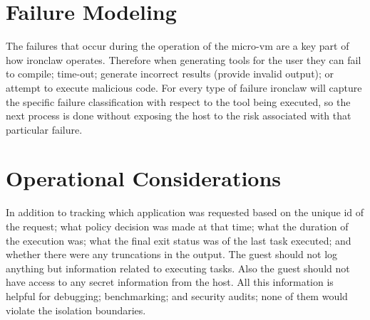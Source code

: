 \section{Failure Modeling}
The failures that occur during the operation of the micro-vm are a key part of how ironclaw operates. Therefore when generating tools for the user they can fail to compile; time-out; generate incorrect results (provide invalid output); or attempt to execute malicious code. For every type of failure ironclaw will capture the specific failure classification with respect to the tool being executed, so the next process is done without exposing the host to the risk associated with that particular failure.

\section{Operational Considerations}
In addition to tracking which application was requested based on the unique id of the request; what policy decision was made at that time; what the duration of the execution was; what the final exit status was of the last task executed; and whether there were any truncations in the output. The guest should not log anything but information related to executing tasks. Also the guest should not have access to any secret information from the host. All this information is helpful for debugging; benchmarking; and security audits; none of them would violate the isolation boundaries.
